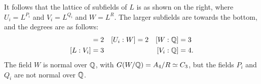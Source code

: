 \documentclass[a4paper]{article}
\begin{document}
\begin{solution}
\begin{itemize}
\begin{center}
   \end{center}
   It follows that the lattice of subfields of $L$ is as shown on the
   right, where $U_i=L^{P_i}$ and $V_i=L^{Q_i}$ and $W=L^R$.  The
   larger subfields are towards the bottom, and the degrees are as
   follows: 
   \begin{align*}
    [L:U_i] &= 2 & [U_i:W] &= 2 & [W:\Q] &= 3 \\
    [L:V_i] &= 3 &         &    & [V_i:\Q] &= 4. 
   \end{align*}
   The field $W$ is normal over ${\mathbb{Q}}$, with $G(W/{\mathbb{Q}})=A_4/R\simeq C_3$,
   but the fields $P_i$ and $Q_i$ are not normal over ${\mathbb{Q}}$.  
 \end{itemize}
\end{solution}
\end{document}
